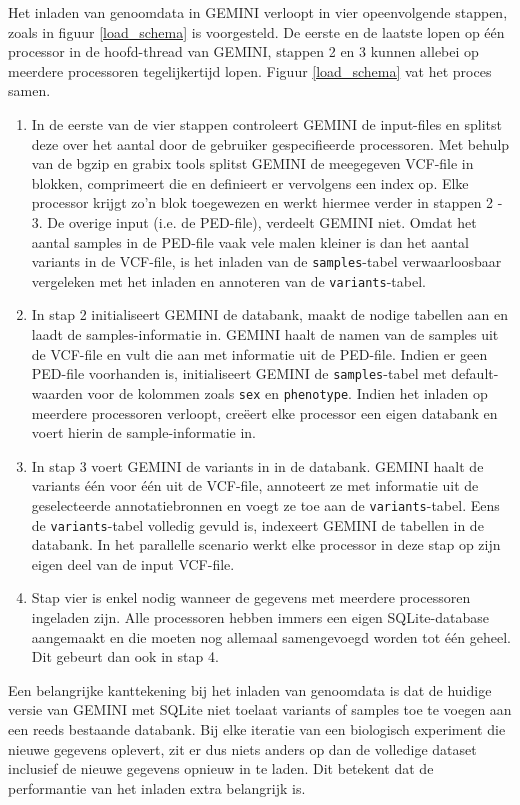 \noindent Het inladen van genoomdata in GEMINI verloopt in vier opeenvolgende stappen, zoals in figuur \ref{load_schema} is voorgesteld. De eerste en de laatste lopen op \'e\'en processor in de hoofd-thread van GEMINI, stappen 2 en 3 kunnen allebei op meerdere processoren tegelijkertijd lopen. Figuur \ref{load_schema} vat het proces samen.
\begin{enumerate}
\item In de eerste van de vier stappen controleert GEMINI de input-files en splitst deze over het aantal door de gebruiker gespecifieerde processoren. Met behulp van de bgzip \cite{bgzip} en grabix \cite{grabix} tools splitst GEMINI de meegegeven VCF-file in blokken, comprimeert die en definieert er vervolgens een index op. Elke processor krijgt zo'n blok toegewezen en werkt hiermee verder in stappen 2 - 3. De overige input (i.e. de PED-file), verdeelt GEMINI niet. Omdat het aantal samples in de PED-file vaak vele malen kleiner is dan het aantal variants in de VCF-file, is het inladen van de \texttt{samples}-tabel verwaarloosbaar vergeleken met het inladen en annoteren van de \texttt{variants}-tabel.
\item In stap 2 initialiseert GEMINI de databank, maakt de nodige tabellen aan en laadt de samples-informatie in. GEMINI haalt de namen van de samples uit de VCF-file en vult die aan met informatie uit de PED-file. Indien er geen PED-file voorhanden is, initialiseert GEMINI de \texttt{samples}-tabel met default-waarden voor de kolommen zoals \texttt{sex} en \texttt{phenotype}. Indien het inladen op meerdere processoren verloopt, cre\"eert elke processor een eigen databank en voert hierin de sample-informatie in.
\item In stap 3 voert GEMINI de variants in in de databank. GEMINI haalt de variants \'e\'en voor \'e\'en uit de VCF-file, annoteert ze met informatie uit de geselecteerde annotatiebronnen en voegt ze toe aan de \texttt{variants}-tabel. Eens de \texttt{variants}-tabel volledig gevuld is, indexeert GEMINI de tabellen in de databank. In het parallelle scenario werkt elke processor in deze stap op zijn eigen deel van de input VCF-file.
\item Stap vier is enkel nodig wanneer de gegevens met meerdere processoren ingeladen zijn. Alle processoren hebben immers een eigen SQLite-database aangemaakt en die moeten nog allemaal samengevoegd worden tot \'e\'en geheel. Dit gebeurt dan ook in stap 4.
\end{enumerate}

Een belangrijke kanttekening bij het inladen van genoomdata is dat de huidige versie van GEMINI met SQLite niet toelaat variants of samples toe te voegen aan een reeds bestaande databank. Bij elke iteratie van een biologisch experiment die nieuwe gegevens oplevert, zit er dus niets anders op dan de volledige dataset inclusief de nieuwe gegevens opnieuw in te laden. Dit betekent dat de performantie van het inladen extra belangrijk is.

